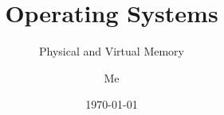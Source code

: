\documentclass[12pt]{beamer}
\title{Operating Systems}
\subtitle{Physical and Virtual Memory}
\author{Me}
\date{\today}
\begin{document}
  \begin{frame}
    \titlepage
  \end{frame}

  
  
  
  

%    
\end{document}
